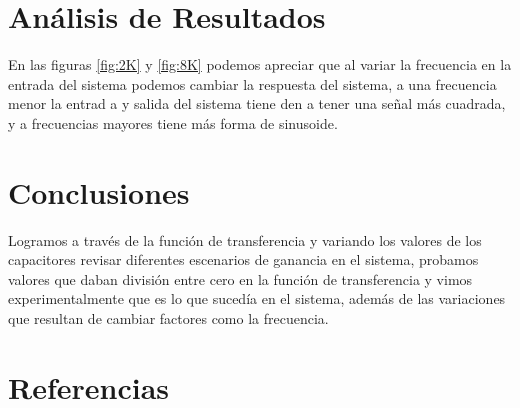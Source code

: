 \documentclass[]{article}
\begin{document}
\section{Análisis de Resultados}

En las figuras \ref{fig:2K} y \ref{fig:8K} podemos apreciar que al variar la frecuencia en la entrada del sistema podemos cambiar la respuesta del sistema, a una frecuencia menor la entrad a y salida del sistema tiene
den a tener una señal más cuadrada, y a frecuencias mayores tiene más forma de sinusoide.\\ 

\section{Conclusiones}

Logramos a través de la función de transferencia y variando los valores de los capacitores revisar diferentes escenarios de ganancia en el sistema, probamos valores que daban división entre cero en la función de transferencia y vimos experimentalmente que es lo que sucedía en el sistema, además de las variaciones que resultan de cambiar factores como la frecuencia.\\

\section{Referencias}



\end{document}
